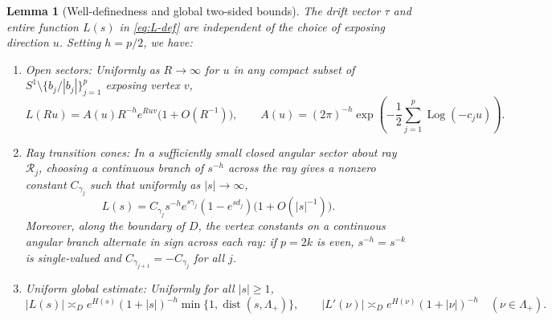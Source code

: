 \documentclass[11pt,reqno]{amsart}
\newtheorem{lemma}[theorem]{Lemma}
\theoremstyle{definition}
\theoremstyle{remark}
\DeclareMathOperator{\Log}{Log}
\DeclareMathOperator{\dist}{dist}
\begin{document}
\begin{lemma}[Well-definedness and global two-sided bounds]\label{lem:L-bounds}
The drift vector $\tau$ and entire function $L(s)$ in \eqref{eq:L-def} are independent of the choice of exposing direction $u$. Setting $h = p/2$, we have:
\begin{enumerate}
  \item \emph{Open sectors}: Uniformly as $R \to \infty$ for $u$ in any compact subset of $S^1 \setminus \{b_j/|b_j|\}_{j=1}^p$ exposing vertex $v$,
  \begin{equation}\label{eq:sector-asymp}
    L(R u) = A(u) R^{-h} e^{R u v}\bigl(1 + O(R^{-1})\bigr),
    \qquad A(u) = (2\pi)^{-h} \exp\!\left(-\frac{1}{2}\sum_{j=1}^p \Log(-c_j u)\right).
  \end{equation}
  \item \emph{Ray transition cones}: In a sufficiently small closed angular sector about ray $\mathcal{R}_j$, choosing a continuous branch of $s^{-h}$ across the ray gives a nonzero constant $C_{\gamma_j}$ such that uniformly as $|s|\to\infty$,
  \begin{equation}\label{eq:ray-asymp}
    L(s) = C_{\gamma_j} s^{-h} e^{s\gamma_j}(1 - e^{s d_j})\bigl(1 + O(|s|^{-1})\bigr).
  \end{equation}
  Moreover, along the boundary of $D$, the vertex constants on a continuous angular branch alternate in sign across each ray: if $p = 2k$ is even, $s^{-h} = s^{-k}$ is single-valued and $C_{\gamma_{j+1}} = -C_{\gamma_j}$ for all $j$.
  \item \emph{Uniform global estimate}: Uniformly for all $|s| \ge 1$,
  \begin{equation}\label{eq:global-L}
    |L(s)| \asymp_D e^{H(s)} (1 + |s|)^{-h} \min\bigl\{1, \dist(s, \Lambda_+)\bigr\},
    \qquad |L'(\nu)| \asymp_D e^{H(\nu)} (1 + |\nu|)^{-h} \quad (\nu \in \Lambda_+).
  \end{equation}
\end{enumerate}
\end{lemma}
\end{document}
